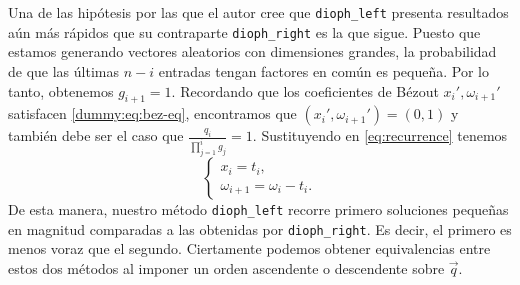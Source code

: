 Una de las hipótesis por las que el autor cree que \texttt{dioph\_left} presenta resultados aún más
rápidos que su contraparte \texttt{dioph\_right} es la que sigue. Puesto que estamos generando
vectores aleatorios con dimensiones grandes, la probabilidad de que las últimas $n - i$ entradas
tengan factores en común es pequeña. Por lo tanto, obtenemos $g_{i+1} = 1$. Recordando que los
coeficientes de Bézout $x_i', \omega_{i+1}'$ satisfacen \eqref{dummy:eq:bez-eq}, encontramos que
$(x_i', \omega_{i + 1}') = (0, 1)$ y también debe ser el caso que $\frac{q_i}{\prod_{j=1}^ig_j} =
1$. Sustituyendo en \eqref{eq:recurrence} tenemos
\begin{equation*}
	\begin{cases}
		x_i = t_i, \\
		\omega_{i + 1} = \omega_i - t_i.
	\end{cases}
\end{equation*}
De esta manera, nuestro método \texttt{dioph\_left} recorre primero soluciones pequeñas en magnitud
comparadas a las obtenidas por \texttt{dioph\_right}. Es decir, el primero es menos voraz que el
segundo. Ciertamente podemos obtener equivalencias entre estos dos métodos al imponer un orden
ascendente o descendente sobre $\vec{q}$.

